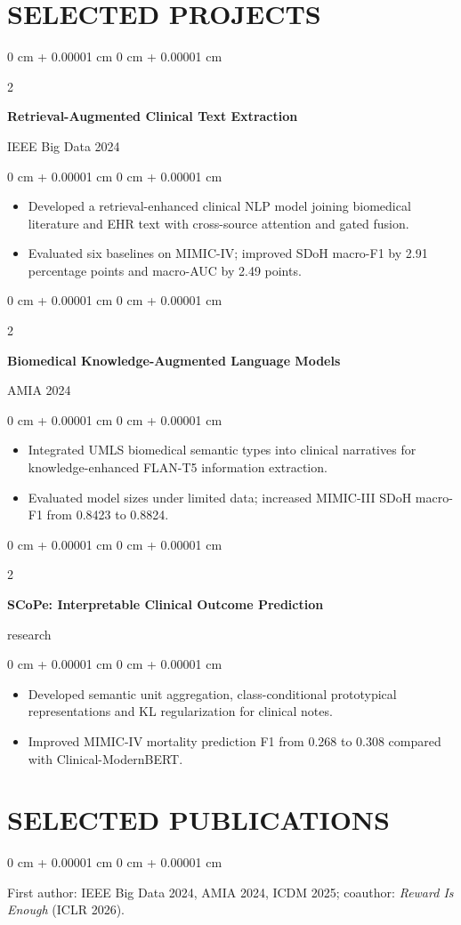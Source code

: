 \documentclass[10pt, letterpaper]{article}
\newenvironment{highlights}{
    \begin{itemize}[
        topsep=0.10 cm,
        parsep=0.10 cm,
        partopsep=0pt,
        itemsep=0pt,
        leftmargin=0 cm + 10pt
    ]
}{
    \end{itemize}
} %
\newenvironment{onecolentry}{
    \begin{adjustwidth}{
        0 cm + 0.00001 cm
    }{
        0 cm + 0.00001 cm
    }
}{
    \end{adjustwidth}
} %
\newenvironment{twocolentry}[2][]{
    \onecolentry
    \def\secondColumn{#2}
    \setcolumnwidth{\fill, 4.5 cm}
    \begin{paracol}{2}
}{
    \switchcolumn \raggedleft \secondColumn
    \end{paracol}
    \endonecolentry
} %
\begin{document}
\section{SELECTED PROJECTS}
\begin{twocolentry}{IEEE Big Data 2024}
\textbf{Retrieval-Augmented Clinical Text Extraction}
\end{twocolentry}
\begin{onecolentry}
\begin{highlights}
\item Developed a retrieval-enhanced clinical NLP model joining biomedical literature and EHR text with cross-source attention and gated fusion.
\item Evaluated six baselines on MIMIC-IV; improved SDoH macro-F1 by 2.91 percentage points and macro-AUC by 2.49 points.
\end{highlights}
\end{onecolentry}
\vspace{0.03 cm}
\begin{twocolentry}{AMIA 2024}
\textbf{Biomedical Knowledge-Augmented Language Models}
\end{twocolentry}
\begin{onecolentry}
\begin{highlights}
\item Integrated UMLS biomedical semantic types into clinical narratives for knowledge-enhanced FLAN-T5 information extraction.
\item Evaluated model sizes under limited data; increased MIMIC-III SDoH macro-F1 from 0.8423 to 0.8824.
\end{highlights}
\end{onecolentry}
\vspace{0.03 cm}
\begin{twocolentry}{2026 research}
\textbf{SCoPe: Interpretable Clinical Outcome Prediction}
\end{twocolentry}
\begin{onecolentry}
\begin{highlights}
\item Developed semantic unit aggregation, class-conditional prototypical representations and KL regularization for clinical notes.
\item Improved MIMIC-IV mortality prediction F1 from 0.268 to 0.308 compared with Clinical-ModernBERT.
\end{highlights}
\end{onecolentry}
\vspace{0.03 cm}
\section{SELECTED PUBLICATIONS}
\begin{onecolentry}
First author: IEEE Big Data 2024, AMIA 2024, ICDM 2025; coauthor: \textit{Reward Is Enough} (ICLR 2026).
\end{onecolentry}
\end{document}
